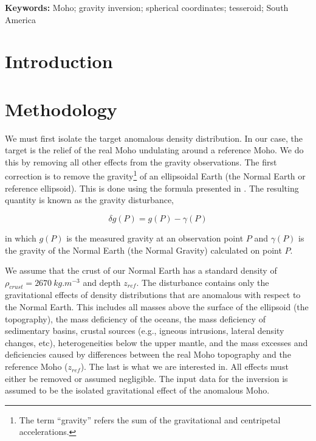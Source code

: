 \documentclass[extra,mreferee]{gji}
\title[]{\Title}
\author[]{
    Leonardo Uieda$^{1,2}$,
    Valéria C. F. Barbosa$^{2}$
    \\
    $^1$Universidade do Estado do Rio de Janeiro, Rio de Janeiro, Brazil.
    e-mail: leo@leouieda.com
    \\
    $^2$Observatório Nacional, Rio de Janeiro, Brazil.
}
\newcommand{\Keywords}{
        Moho;
        gravity inversion;
        spherical coordinates;
        tesseroid;
        South America
}
\begin{document}
\maketitle

\noindent \textbf{Keywords:} \Keywords

\begin{abstract}
\end{abstract}



\section{Introduction}


\section{Methodology}

We must first isolate the target anomalous density distribution.
In our case, the target is the relief of the real Moho undulating around a
reference Moho.
We do this by removing all other effects from the gravity observations.
The first correction is to remove the gravity\footnote{The term ``gravity''
refers the sum of the gravitational and centripetal accelerations.}
of an ellipsoidal Earth (the Normal Earth or reference ellipsoid).
This is done using the formula presented in \citet{li_ellipsoid_2001}.
The resulting quantity is known as the gravity disturbance,

\begin{equation}
    \delta g(P) = g(P) - \gamma(P)
\end{equation}

\noindent in which $g(P)$ is the measured gravity at an observation point $P$
and $\gamma(P)$ is the gravity of the Normal Earth (the Normal Gravity)
calculated on point $P$.

We assume that the crust of our Normal Earth has a standard density of
$\rho_{crust} = 2670\ kg.m^{-3}$ and depth $z_{ref}$.
The disturbance contains only the gravitational effects of density
distributions that are anomalous with respect to the Normal Earth.
This includes all masses above the surface of the ellipsoid (the topography),
the mass deficiency of the oceans,
the mass deficiency of sedimentary basins,
crustal sources (e.g., igneous intrusions, lateral density changes, etc),
heterogeneities below the upper mantle,
and
the mass excesses and deficiencies caused by differences between the real Moho
topography and the reference Moho ($z_{ref}$).
The last is what we are interested in.
All effects must either be removed or assumed negligible.
The input data for the inversion is assumed to be the isolated gravitational
effect of the anomalous Moho.
\end{document}
